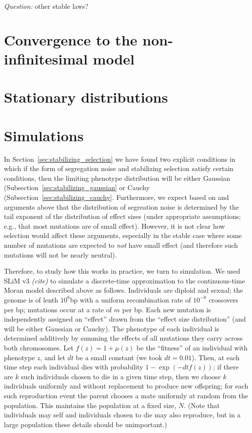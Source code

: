\documentclass{article}
\newcommand{\comment}[1]{{\color{blue} \it #1}}
\theoremstyle{remark}
\theoremstyle{definition}
\begin{document}

\bigskip

\noindent\emph{Question:} other stable laws?


\section{Convergence to the non-infinitesimal model}  %

\section{Stationary distributions}  %

\section{Simulations}  %

In Section~\ref{sec:stabilizing_selection}
we have found two explicit conditions in which
if the form of segregation noise and stabilizing selection
satisfy certain conditions,
then the limiting phenotype distribution
will be either Gaussian (Subsection~\ref{sec:stabilizing_gaussian}
or Cauchy (Subsection~\ref{sec:stabilizing_cauchy}.
Furthermore, we expect based on
\citet{barton2017infinitesimal} and arguments above
that the distribution of segreation noise
is determined by the tail exponent of the distribution of effect sizes
(under appropriate assumptions; e.g., that most mutations are of small effect).
However, it is not clear how selection would affect these arguments,
especially in the stable case where some number of mutations are expected to
\emph{not} have small effect (and therefore such mutations will not be nearly neutral).

Therefore,
to study how this works in practice, we turn to simulation.
We used SLiM v3 \comment{(cite)}
to simulate a discrete-time approximation to the continuous-time Moran model described above
as follows.
Individuals are diploid and sexual;
the genome is of lenth $10^8$bp with a uniform recombination rate of $10^{-8}$ crossovers per bp;
mutations occur at a rate of $m$ per bp.
Each new mutation is independently assigned an ``effect''
drawn from the ``effect size distribution'' (and will be either Gaussian or Cauchy).
The phenotype of each individual is determined additively
by summing the effects of all mutations they carry across both chromosomes.
Let $f(z) = 1 + \mu(z)$
be the ``fitness'' of an individual with phenotype $z$,
and let $dt$ be a small constant (we took $dt=0.01$).
Then, at each time step
each individual dies with probability $1 - \exp(-dt f(z))$;
if there are $k$ such individuals chosen to die in a given time step,
then we choose $k$ individuals uniformly and without replacement
to produce new offspring;
for each such reproduction event the parent chooses a mate uniformly at random from the population.
This maintains the population at a fixed size, $N$.
(Note that individuals may self and individuals chosen to die may also reproduce,
but in a large population these details should be unimportant.)
\end{document}
